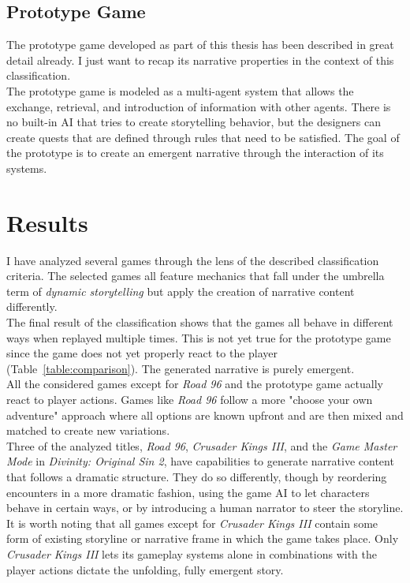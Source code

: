 \subsection{Prototype Game}
The prototype game developed as part of this thesis has been described in great detail already. I just want to recap its narrative properties in the context of this classification.\\
The prototype game is modeled as a multi-agent system that allows the exchange, retrieval, and introduction of information with other agents. There is no built-in AI that tries to create storytelling behavior, but the designers can create quests that are defined through rules that need to be satisfied. The goal of the prototype is to create an emergent narrative through the interaction of its systems.
\section{Results}
I have analyzed several games through the lens of the described classification criteria. The selected games all feature mechanics that fall under the umbrella term of \textit{dynamic storytelling} but apply the creation of narrative content differently.\\
The final result of the classification shows that the games all behave in different ways when replayed multiple times. This is not yet true for the prototype game since the game does not yet properly react to the player (Table~\ref{table:comparison}). The generated narrative is purely emergent.\\
All the considered games except for \textit{Road 96} and the prototype game actually react to player actions. Games like \textit{Road 96} follow a more "choose your own adventure" approach where all options are known upfront and are then mixed and matched to create new variations.\\
Three of the analyzed titles, \textit{Road 96}, \textit{Crusader Kings III}, and the \textit{Game Master Mode} in \textit{Divinity: Original Sin 2}, have capabilities to generate narrative content that follows a dramatic structure. They do so differently, though by reordering encounters in a more dramatic fashion, using the game AI to let characters behave in certain ways, or by introducing a human narrator to steer the storyline.\\
It is worth noting that all games except for \textit{Crusader Kings III} contain some form of existing storyline or narrative frame in which the game takes place. Only \textit{Crusader Kings III} lets its gameplay systems alone in combinations with the player actions dictate the unfolding, fully emergent story. 
